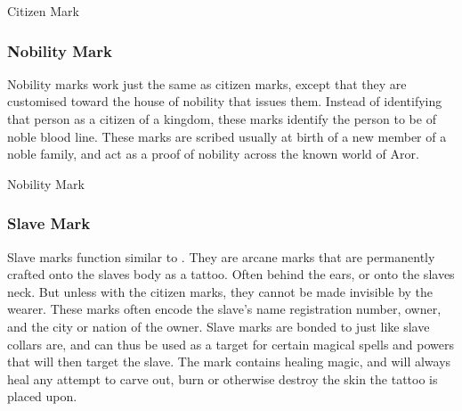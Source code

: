\begin{35e}{Citizen Mark}
\end{35e}

\subsubsection{Nobility Mark}
\label{sec:Nobility Mark}

Nobility marks work just the same as citizen marks, except that they are
customised toward the house of nobility that issues them. Instead of
identifying that person as a citizen of a kingdom, these marks identify the
person to be of noble blood line. These marks are scribed usually at birth of
a new member of a noble family, and act as a proof of nobility across the
known world of Aror.

\begin{35e}{Nobility Mark}
\end{35e}

\subsubsection{Slave Mark}
\label{sec:Slave Mark}

Slave marks function similar to . They are arcane
marks that are permanently crafted onto the slaves body as a tattoo. Often
behind the ears, or onto the slaves neck. But unless with the citizen marks,
they cannot be made invisible by the wearer. These marks often encode the
slave's name registration number, owner, and the city or nation of the
owner. Slave marks are bonded to  just like slave
collars are, and can thus be used as a target for certain magical spells and
powers that will then target the slave. The mark contains healing magic, and
will always heal any attempt to carve out, burn or otherwise destroy the skin
the tattoo is placed upon.

